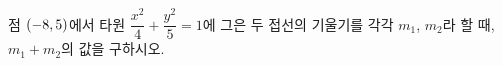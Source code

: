 점 $(-8{,}\mkern3mu\mathopen{}5)$에서 타원 $\dfrac{x^2}{4}+\dfrac{y^2}{5}=1$에 그은 두 접선의 기울기를 각각 $m_1$, $m_2$라 할 때, $m_1+m_2$의 값을 구하시오.
